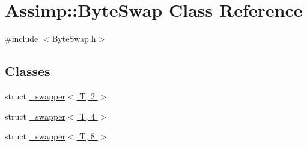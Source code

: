 \hypertarget{class_assimp_1_1_byte_swap}{\section{Assimp\+:\+:Byte\+Swap Class Reference}
\label{class_assimp_1_1_byte_swap}
}


{\ttfamily \#include $<$Byte\+Swap.\+h$>$}

\subsection*{Classes}
\begin{DoxyCompactItemize}
\item 
struct \hyperlink{struct_assimp_1_1_byte_swap_1_1__swapper_3_01_t_00_012_01_4}{\+\_\+swapper$<$ T, 2 $>$}
\item 
struct \hyperlink{struct_assimp_1_1_byte_swap_1_1__swapper_3_01_t_00_014_01_4}{\+\_\+swapper$<$ T, 4 $>$}
\item 
struct \hyperlink{struct_assimp_1_1_byte_swap_1_1__swapper_3_01_t_00_018_01_4}{\+\_\+swapper$<$ T, 8 $>$}
\end{DoxyCompactItemize}
